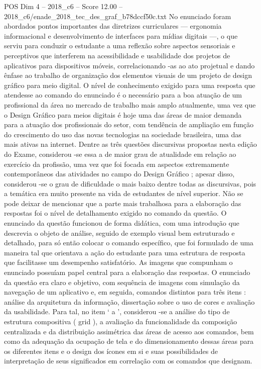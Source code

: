 \begin{textsample}{POS Dim 4 – 2018\_c6 – Score 12.00 – 2018\_c6/enade\_2018\_tec\_des\_graf\_b78dccf50c.txt}
No enunciado foram abordados pontos importantes das diretrizes curriculares — ergonomia informacional e desenvolvimento de interfaces para mídias digitais —, o que serviu para conduzir o estudante a uma reflexão sobre aspectos sensoriais e perceptivos que interferem na acessibilidade e usabilidade dos projetos de aplicativos para dispositivos móveis, correlacionando -as ao ato projetual e dando ênfase ao trabalho de organização dos elementos visuais de um projeto de design gráfico para meio digital.
O nível de conhecimento exigido para uma resposta que atendesse ao comando do enunciado é o necessário para a boa atuação de um profissional da área no mercado de trabalho mais amplo atualmente, uma vez que o Design Gráfico para meios digitais é hoje uma das áreas de maior demanda para a atuação dos profissionais do setor, com tendência de ampliação em função do crescimento do uso das novas tecnologias na sociedade brasileira, uma das mais ativas na internet.
Dentre as três questões discursivas propostas nesta edição do Exame, considerou -se essa a de maior grau de atualidade em relação ao exercício da profissão, uma vez que foi focada em aspectos extremamente contemporâneos das atividades no campo do Design Gráfico ; apesar disso, considerou -se o grau de dificuldade o mais baixo dentre todas as discursivas, pois a temática era muito presente na vida de estudantes de nível superior.
Não se pode deixar de mencionar que a parte mais trabalhosa para a elaboração das respostas foi o nível de detalhamento exigido no comando da questão.
O enunciado da questão funcionou de forma didática, com uma introdução que descrevia o objeto de análise, seguido de exemplo visual bem estruturado e detalhado, para só então colocar o comando específico, que foi formulado de uma maneira tal que orientava a ação do estudante para uma estrutura de resposta que facilitasse um desempenho satisfatório.
As imagens que compunham o enunciado possuíam papel central para a elaboração das respostas.
O enunciado da questão era claro e objetivo, com sequência de imagens com simulação da navegação de um aplicativo e, em seguida, comandos distintos para três itens : análise da arquitetura da informação, dissertação sobre o uso de cores e avaliação da usabilidade.
Para tal, no item ‘ a ’, considerou -se a análise do tipo de estrutura compositiva ( grid ), a avaliação da funcionalidade da composição centralizada e da distribuição assimétrica das áreas de acesso aos comandos, bem como da adequação da ocupação de tela e do dimensionamento dessas áreas para os diferentes itens e o design dos ícones em si e suas possibilidades de interpretação de seus significados em correlação com os comandos que designam.

\end{textsample}

